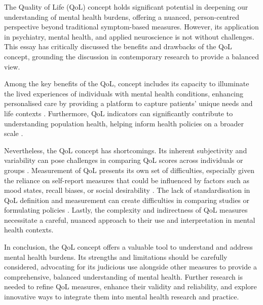 \documentclass[10pt]{article}
\begin{document}
\begin{sloppypar}
  The Quality of Life (QoL) concept holds significant potential in deepening our understanding of mental health burdens, offering a nuanced, person-centred perspective beyond traditional symptom-based measures. However, its application in psychiatry, mental health, and applied neuroscience is not without challenges. This essay has critically discussed the benefits and drawbacks of the QoL concept, grounding the discussion in contemporary research to provide a balanced view.

  Among the key benefits of the QoL, concept includes its capacity to illuminate the lived experiences of individuals with mental health conditions, enhancing personalised care by providing a platform to capture patients' unique needs and life contexts
  \citep{dwamena_interventions_2012,endicott_quality_1993}. Furthermore, QoL indicators can significantly contribute to understanding population health, helping inform health policies on a broader scale
  \citep{gbd_2017_disease_and_injury_incidence_and_prevalence_collaborators_global_2018}.

  Nevertheless, the QoL concept has shortcomings. Its inherent subjectivity and variability can pose challenges in comparing QoL scores across individuals or groups \citep{skevington_expecting_2012}. Measurement of QoL presents its own set of difficulties, especially given the reliance on self-report measures that could be influenced by factors such as mood states, recall biases, or social desirability \citep{bowling_just_2005}. The lack of standardisation in QoL definition and measurement can create difficulties in comparing studies or formulating policies \citep{matarazzo_behavioral_1980}. Lastly, the complexity and indirectness of QoL measures necessitate a careful, nuanced approach to their use and interpretation in mental health contexts.

  In conclusion, the QoL concept offers a valuable tool to understand and address mental health burdens. Its strengths and limitations should be carefully considered, advocating for its judicious use alongside other measures to provide a comprehensive, balanced understanding of mental health. Further research is needed to refine QoL measures, enhance their validity and reliability, and explore innovative ways to integrate them into mental health research and practice.

  \pagebreak
  \singlespacing %
  
  

\end{sloppypar}
\end{document}
